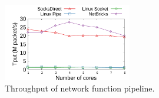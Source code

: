 \begin{figure}[htbp]
	\centering
	\includegraphics[width=0.5\textwidth]{eval/microbenchmark/nfv-tun-tput.pdf}
	
	\caption{Throughput of network function pipeline.}
	\label{socksdirect:fig:eval-tun-tput}
	
	
\end{figure}



